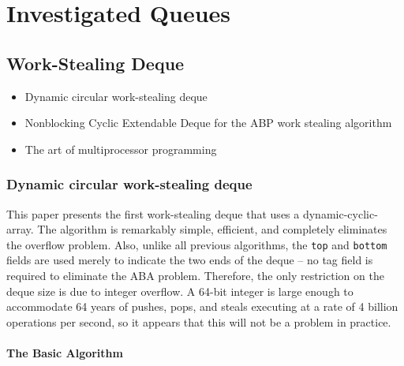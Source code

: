 
\chapter{Investigated Queues}
\label{chap:queues-implementation}

\section{Work-Stealing Deque}
\label{sec:queues-implementation-ws-deque}


\begin{itemize}
\item Dynamic circular work-stealing deque \cite{Chase2005}
\item Nonblocking Cyclic Extendable Deque for the ABP work stealing
  algorithm \cite{Lev2005}
\item The art of multiprocessor programming \cite{Herlihy2008}
\end{itemize}

\subsection{Dynamic circular work-stealing deque \cite{Chase2005}}

This paper presents the first work-stealing deque that uses a
dynamic-cyclic-array. The algorithm is remarkably simple, efficient,
and completely eliminates the overflow problem. Also, unlike all
previous algorithms, the \lstinline!top! and \lstinline!bottom! fields
are used merely to indicate the two ends of the deque -- no tag field
is required to eliminate the ABA problem. Therefore, the only
restriction on the deque size is due to integer overflow. A 64-bit
integer is large enough to accommodate 64 years of pushes, pops, and
steals executing at a rate of 4 billion operations per second, so it
appears that this will not be a problem in practice.

\subsubsection{The Basic Algorithm}


